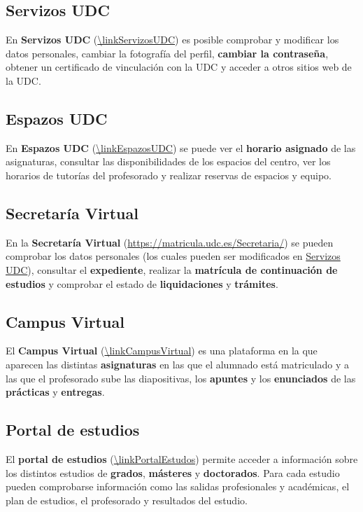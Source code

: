 \subsection{Servizos UDC}

En \textbf{Servizos UDC} (\url{\linkServizosUDC}) es posible comprobar y modificar los datos personales, cambiar la fotografía del perfil, \textbf{cambiar la contraseña}, obtener un certificado de vinculación con la \acrshort{UDC} y acceder a otros sitios web de la \acrshort{UDC}.

\subsection{Espazos UDC}

En \textbf{Espazos UDC} (\url{\linkEspazosUDC}) se puede ver el \textbf{horario asignado} de las asignaturas, consultar las disponibilidades de los espacios del centro, ver los horarios de tutorías del profesorado y realizar reservas de espacios y equipo. 

\subsection{Secretaría Virtual}

En la \textbf{Secretaría Virtual} (\url{https://matricula.udc.es/Secretaria/}) se pueden comprobar los datos personales (los cuales pueden ser modificados en \href{\linkServizosUDC}{Servizos UDC}), consultar el \textbf{expediente}, realizar la \textbf{matrícula de continuación de estudios} y comprobar el estado de \textbf{liquidaciones} y \textbf{trámites}.

\subsection{Campus Virtual}

El \textbf{Campus Virtual} (\url{\linkCampusVirtual}) es una plataforma en la que aparecen las distintas \textbf{asignaturas} en las que el alumnado está matriculado y a las que el profesorado sube las diapositivas, los \textbf{apuntes} y los \textbf{enunciados} de las \textbf{prácticas} y \textbf{entregas}.

\subsection{Portal de estudios}

El \textbf{portal de estudios} (\url{\linkPortalEstudos}) permite acceder a información sobre los distintos estudios de \textbf{grados}, \textbf{másteres} y \textbf{doctorados}. Para cada estudio pueden comprobarse información como las salidas profesionales y académicas, el plan de estudios, el profesorado y resultados del estudio.
